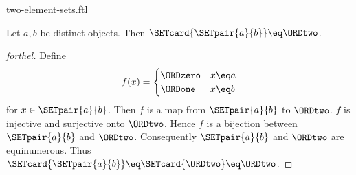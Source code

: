 \documentclass{naproche-library}
\begin{document}
\begin{smodule}[title=$2$-Element Sets]{two-element-sets.ftl}

\begin{proposition}[forthel,id=SET_THEORY_07_5465279026954240]
  Let $a, b$ be distinct objects.
  Then $\SETcard{\SETpair{a}{b}} \eq \ORDtwo$.
\end{proposition}
\begin{proof}[forthel]
  Define \[ f(x) =
    \begin{cases}
      \ORDzero & x \eq a
      \\
      \ORDone & x \eq b
    \end{cases} \]
  for $x \in \SETpair{a}{b}$.
  Then $f$ is a map from $\SETpair{a}{b}$ to $\ORDtwo$.
  $f$ is injective and surjective onto $\ORDtwo$.
  Hence $f$ is a bijection between $\SETpair{a}{b}$ and $\ORDtwo$.
  Consequently $\SETpair{a}{b}$ and $\ORDtwo$ are equinumerous.
  Thus $\SETcard{\SETpair{a}{b}} \eq \SETcard{\ORDtwo} \eq \ORDtwo$.
\end{proof}
\end{smodule}
\end{document}
